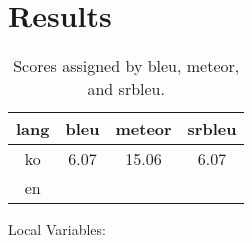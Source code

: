 \section{Results}
\label{sec:results}

\begin{table}[h]
  \centering
  \begin{tabular}{|c|c|c|c|}
    lang & bleu & meteor & srbleu \\
\hline
ko & 6.07 & 15.06 & 6.07 \\
en & & & \\

\hline
  \end{tabular}
  \caption{Scores assigned by bleu, meteor, and srbleu.}
  \label{tab:scores}
\end{table}
Local Variables: 
